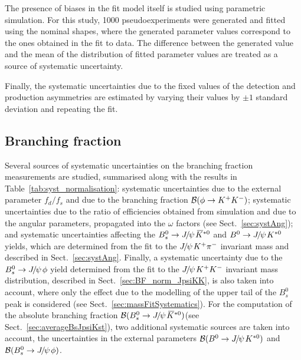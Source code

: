 \documentclass[12pt,a4paper]{article}
\def\PJ      {\ensuremath{J}\xspace}
\def\Ppsi {\ensuremath{\psi}\xspace}
\def\jpsi     {{\ensuremath{{\PJ\mskip -3mu/\mskip -2mu\Ppsi\mskip 2mu}}}\xspace}
\newcommand{\Bs}{\ensuremath{B^0_s}\xspace}
\newcommand{\BdJpsiKst}{\ensuremath{B^0\to \jpsi K^{*0}}\xspace}
\newcommand{\BsJpsiKst}{\ensuremath{B^0_s\to \jpsi \Kstarzb}\xspace}
\newcommand{\BsJpsiPhi}{\ensuremath{B^0_s\to \jpsi \phi}\xspace}
\def\Kbar  {\kern 0.2em\overline{\kern -0.2em K}{}\xspace}
\def\Kstarzb {\ensuremath{\Kbar^{*0}}\xspace}
\newcommand{\BRof}[1]{\ensuremath{{\cal B}(#1)}\xspace}
\newcommand{\tabref}[1]{Table~\ref{#1}}
\newcommand{\secref}[1]{Sect.~\ref{#1}}
\begin{document}
The presence of biases in the fit model itself is studied using parametric simulation. For this study, 1000 pseudoexperiments were generated and fitted using the nominal shapes, where the generated parameter values correspond to the ones obtained in the fit to data. 
The difference between the generated value and the mean of the distribution of fitted parameter values are treated as a source of systematic uncertainty. 

Finally, the systematic uncertainties due to the fixed values of the detection and production asymmetries are estimated by varying their values by $\pm 1$ standard deviation and repeating the fit.

\subsection{Branching fraction}\label{sec:systBR}

Several sources of systematic uncertainties on the branching fraction measurements are studied, summarised along with the results in \tabref{tab:syst_normalisation}:
systematic uncertainties due to the external parameter $f_d/f_s$ and due to the branching fraction $\BRof{\phi\to K^+K^-}$;
systematic uncertainties due to the ratio of efficiencies obtained from simulation and due to the angular parameters, propagated into the $\omega$ factors (see \secref{sec:systAng});
and systematic uncertainties affecting the \BsJpsiKst and \BdJpsiKst yields, which are determined from the fit to the $\jpsi K^+\pi^-$ invariant mass and described in \secref{sec:systAng}. 
Finally, a systematic uncertainty due to the \BsJpsiPhi yield determined from the fit to the $\jpsi K^+K^-$ invariant mass distribution, described in \secref{sec:BF_norm_JpsiKK}, is also taken into account, where only the effect due to the modelling of the upper tail of the \Bs peak is considered (see \secref{sec:massFitSystematics}). 
For the computation of the absolute branching fraction \BRof\BsJpsiKst (see \secref{sec:averageBsJpsiKst}), two additional systematic sources are taken into account, the uncertainties in the external parameters \BRof\BdJpsiKst and \BRof\BsJpsiPhi.
\end{document}
